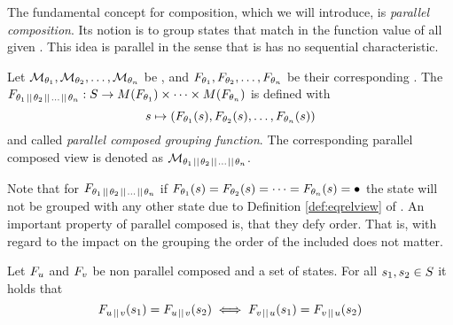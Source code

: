 \documentclass[preview]{standalone}
\begin{document}
The fundamental concept for composition, which we will introduce, is \emph{parallel composition}. Its notion is to group states that match in the function value of all given \grpfctsN. This idea is parallel in the sense that is has no sequential characteristic.

\begin{definition} \label{def:pllcompviewandgfct}
	Let $\view[\viewppty_1], \view[\viewppty_2], \dots, \view[\viewppty_n]$ be \viewsN, and $\grpfct[\viewppty_1], \grpfct[\viewppty_2], \dots, \grpfct[\viewppty_n]$ be their corresponding \grpfctsN. The \grpfctN $\grpfct[{\viewppty_1 \pll \viewppty_2 \pll \dots \pll \viewppty_n}]: \states \to \arbset(\grpfct[\viewppty_1]) \times \dots \times \arbset(\grpfct[\viewppty_n])$ is defined with
	\[
	\state \mapsto (\grpfct[\viewppty_1](\state), \grpfct[\viewppty_2](\state), \dots, \grpfct[\viewppty_n](\state))
	\] 
	and called \emph{parallel composed grouping function}.
	The corresponding parallel composed view is denoted as $\view[\viewppty_1 \pll \viewppty_2 \pll \dots \pll \viewppty_n]$.
\end{definition}

Note that for $\grpfct[{\viewppty_1 \pll \viewppty_2 \pll \dots \pll \viewppty_n}]$ if $\grpfct[\viewppty_1](\state) = \grpfct[\viewppty_2](\state) = \dots = \grpfct[\viewppty_n](\state) = \remelem$ the state \state will not be grouped with any other state due to Definition \ref{def:eqrelview} of \eqrelview. An important property of parallel composed \grpfctsN is, that they defy order. That is, with regard to the impact on the grouping the order of the included \grpfctsN does not matter.

\begin{proposition}
	Let $\grpfct[u]$ and $\grpfct[v]$ be non parallel composed \grpfctsN and \states a set of states. For all $\state_1, \state_2 \in \states$ it holds that
	\[
	\grpfct[u \pll v](\state_1) = \grpfct[u \pll v](\state_2) \iff \grpfct[v \pll u](\state_1) = \grpfct[v \pll u](\state_2)
	\]
\end{proposition}
\end{document}
